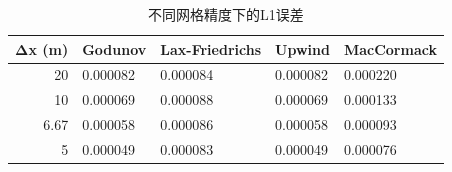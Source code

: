\begin{table}
\caption{不同网格精度下的L1误差}
\label{tab:conv}
\begin{tabular}{rllll}
\toprule
Δx (m) & Godunov & Lax-Friedrichs & Upwind & MacCormack \\
\midrule
20 & 0.000082 & 0.000084 & 0.000082 & 0.000220 \\
10 & 0.000069 & 0.000088 & 0.000069 & 0.000133 \\
6.67 & 0.000058 & 0.000086 & 0.000058 & 0.000093 \\
5 & 0.000049 & 0.000083 & 0.000049 & 0.000076 \\
\bottomrule
\end{tabular}
\end{table}
